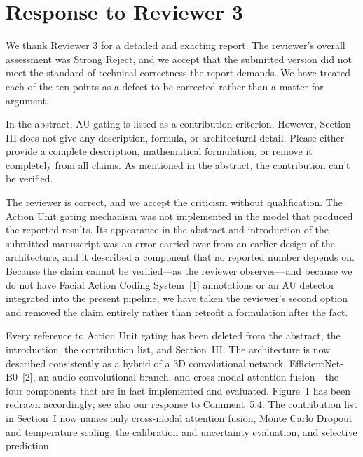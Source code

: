 \section*{Response to Reviewer 3}

We thank Reviewer 3 for a detailed and exacting report. The reviewer's
overall assessment was Strong Reject, and we accept that the submitted
version did not meet the standard of technical correctness the report
demands. We have treated each of the ten points as a defect to be
corrected rather than a matter for argument.


\begin{reviewercomment}
In the abstract, AU gating is listed as a contribution criterion.
However, Section III does not give any description, formula, or
architectural detail. Please either provide a complete description,
mathematical formulation, or remove it completely from all claims. As
mentioned in the abstract, the contribution can't be verified.
\end{reviewercomment}

\response The reviewer is correct, and we accept the criticism without
qualification. The Action Unit gating mechanism was not implemented in
the model that produced the reported results. Its appearance in the
abstract and introduction of the submitted manuscript was an error
carried over from an earlier design of the architecture, and it described
a component that no reported number depends on. Because the claim cannot
be verified---as the reviewer observes---and because we do not have
Facial Action Coding System~[1] annotations or an AU
detector integrated into the present pipeline, we have taken the
reviewer's second option and removed the claim entirely rather than
retrofit a formulation after the fact.

\begin{changesblock}
Every reference to Action Unit gating has been deleted from the
abstract, the introduction, the contribution list, and Section~III.
The architecture is now described consistently as a hybrid of a 3D
convolutional network, EfficientNet-B0~[2], an audio
convolutional branch, and cross-modal attention fusion---the four
components that are in fact implemented and evaluated. Figure~1 has been
redrawn accordingly; see also our response to Comment~5.4. The
contribution list in Section~I now names only cross-modal attention
fusion, Monte Carlo Dropout and temperature scaling, the calibration and
uncertainty evaluation, and selective prediction.
\end{changesblock}

